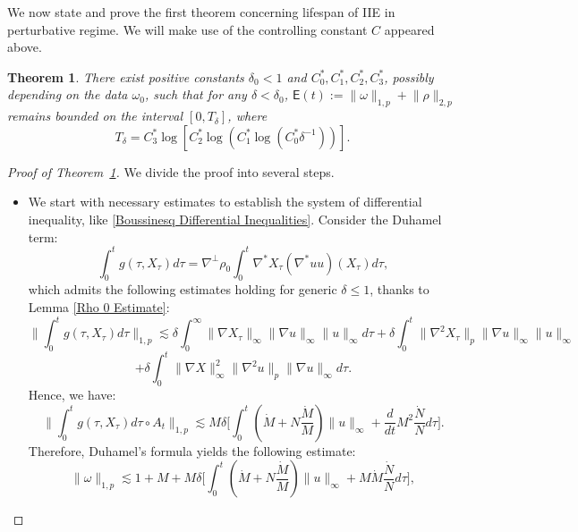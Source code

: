 \documentclass[12pt,letterpaper]{article}
\newtheorem{thm}{Theorem}[section]
\theoremstyle{plain}
\begin{document}
We now state and prove the first theorem concerning lifespan of IIE in perturbative regime.  We will make use of the controlling constant $C$ appeared above.
\begin{thm}\label{Lifespan of IIE}
There exist positive constants $\delta_0<1$ and $C_0^*,C_1^*, C_2^*,C_3^*$, possibly depending on the data $\omega_0$, such that for any $\delta<\delta_0$, $\mathsf E(t):=\lVert\omega\rVert_{1,p}+\lVert\rho\rVert_{2,p}$ remains bounded on the interval $[0,T_\delta]$, where
\begin{equation*}
 T_\delta=C_3^*\log[C_2^*\log( C_1^*\log (C_0^*\delta^{-1}))]. 
\end{equation*}
\end{thm}
\begin{proof}[Proof of Theorem~\ref{Lifespan of IIE}]
We divide the proof into several steps.
\begin{itemize}
    \item [(I)] We start with necessary estimates to establish the system of differential inequality, like \eqref{Boussinesq Differential Inequalities}. Consider the Duhamel term:
\begin{equation*}
\int_0^t g(\tau,X_\tau)d\tau=\nabla^\perp\rho_0 \int_0^t \nabla^* X_\tau (\nabla^* uu)(X_\tau)d\tau,
\end{equation*}
which admits the following estimates holding for generic $\delta\le 1$, thanks to Lemma \ref{Rho 0 Estimate}:
\begin{equation*}
 \bigg\lVert  \int_0^t g(\tau,X_\tau)d\tau \bigg\rVert_{1,p}\lesssim  \delta\int_0^\infty \lVert \nabla X_\tau\rVert_\infty \lVert\nabla u\rVert_\infty \lVert u\rVert_\infty d\tau+\delta  \int_0^t\lVert\nabla^2 X_\tau\rVert_p \lVert\nabla u\rVert_\infty \lVert u\rVert_\infty
\end{equation*}
\begin{equation*}
 +\delta\int_0^t\lVert\nabla X\rVert_\infty^2 \lVert\nabla^2 u\rVert_p\lVert \nabla u\rVert_\infty d\tau .  
\end{equation*}
Hence, we have:
\begin{equation*}
  \bigg\lVert  \int_0^t g(\tau,X_\tau)d\tau \circ A_t\bigg\rVert_{1,p} \lesssim  M\delta\Big[\int_0^t (\dot M+N\frac{\dot M}{M})\lVert u\rVert_\infty+\frac{d}{dt}M^2 \frac{\dot N}{N}d\tau
  \Big].
\end{equation*}
Therefore, Duhamel's formula yields the following estimate:
\begin{equation*}
 \lVert\omega\rVert_{1,p}\lesssim 1+M+  M\delta\Big[\int_0^t (\dot M+N\frac{\dot M}{M})\lVert u\rVert_\infty+M\dot M \frac{\dot N}{N}d\tau\Big],

\end{equation*}
\end{itemize}
\end{proof}
\end{document}
